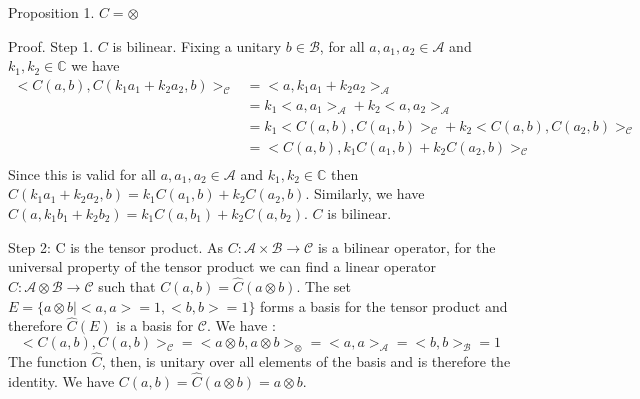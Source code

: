 \documentclass{article}
\begin{document}
Proposition 1. $C = \otimes $

Proof. Step 1. $C$ is bilinear. Fixing a unitary $b \in \mathcal{B}$, for all $a, a_1, a_2 \in \mathcal{A}$ and $k_1, k_2 \in \mathbb{C}$ we have
\begin{equation}
	\begin{aligned}
	<C(a, b), C(k_1a_1 + k_2a_2, b)>_\mathcal{C} &= <a, k_1a_1 + k_2a_2>_\mathcal{A} \\
	&= k_1<a, a_1>_\mathcal{A} + k_2<a, a_2>_\mathcal{A} \\
	&= k_1<C(a, b), C(a_1, b)>_\mathcal{C} + k_2<C(a, b), C(a_2, b)>_\mathcal{C} \\
	&= <C(a, b), k_1C(a_1, b) + k_2C(a_2, b)>_\mathcal{C} \\
	\end{aligned}
\end{equation}
Since this is valid for all $a, a_1, a_2 \in \mathcal{A}$ and $k_1, k_2 \in \mathbb{C}$ then $C(k_1a_1 + k_2a_2, b)=k_1C(a_1, b) + k_2C(a_2, b)$. Similarly, we have $C(a, k_1b_1 + k_2b_2)=k_1C(a, b_1) + k_2C(a, b_2)$. $C$ is bilinear.



Step 2: C is the tensor product. As $C : \mathcal{A} \times \mathcal{B} \to \mathcal{C}$ is a bilinear operator, for the universal property of the tensor product we can find a linear operator $\hat{C} : \mathcal{A} \otimes \mathcal{B} \to \mathcal{C}$ such that $C(a, b) = \hat{C}(a \otimes b)$. The set $E = \{ a\otimes b | <a,a>=1, <b,b>=1 \}$ forms a basis for the tensor product and therefore $\hat{C}(E)$ is a basis for $\mathcal{C}$. We have :
$$<C(a, b), C(a, b)>_\mathcal{C} = <a\otimes b, a \otimes b>_{\otimes} = <a, a>_\mathcal{A} = <b, b>_\mathcal{B} = 1$$
The function $\hat{C}$, then, is unitary over all elements of the basis and is therefore the identity. We have $C(a, b) = \hat{C}(a \otimes b) = a \otimes b$.
\end{document}
